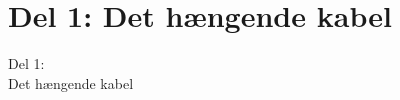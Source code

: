 \section{Del 1: Det hængende kabel}
\begin{frame}
\centering
\Huge
Del 1: \\
Det hængende kabel
\end{frame}
%






